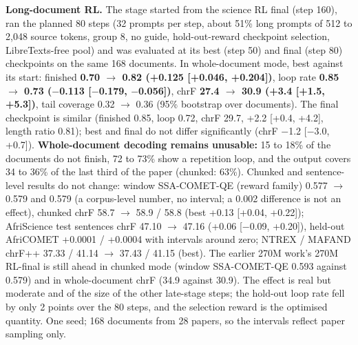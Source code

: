 \textbf{Long-document RL.} The stage started from the science RL final (step 160), ran the planned 80 steps (32 prompts per step, about 51\% long prompts of 512 to 2,048 source tokens, group 8, no guide, hold-out-reward checkpoint selection, LibreTexts-free pool) and was evaluated at its best (step 50) and final (step 80) checkpoints on the same 168 documents. In whole-document mode, best against its start: finished \textbf{0.70 $\to$ 0.82 (+0.125 [+0.046, +0.204])}, loop rate \textbf{0.85 $\to$ 0.73 (\ensuremath{-}0.113 [\ensuremath{-}0.179, \ensuremath{-}0.056])}, chrF \textbf{27.4 $\to$ 30.9 (+3.4 [+1.5, +5.3])}, tail coverage 0.32 $\to$ 0.36 (95\% bootstrap over documents). The final checkpoint is similar (finished 0.85, loop 0.72, chrF 29.7, +2.2 [+0.4, +4.2], length ratio 0.81); best and final do not differ significantly (chrF \ensuremath{-}1.2 [\ensuremath{-}3.0, +0.7]). \textbf{Whole-document decoding remains unusable:} 15 to 18\% of the documents do not finish, 72 to 73\% show a repetition loop, and the output covers 34 to 36\% of the last third of the paper (chunked: 63\%). Chunked and sentence-level results do not change: window SSA-COMET-QE (reward family) 0.577 $\to$ 0.579 and 0.579 (a corpus-level number, no interval; a 0.002 difference is not an effect), chunked chrF 58.7 $\to$ 58.9 / 58.8 (best +0.13 [+0.04, +0.22]); AfriScience test sentences chrF 47.10 $\to$ 47.16 (+0.06 [\ensuremath{-}0.09, +0.20]), held-out AfriCOMET +0.0001 / +0.0004 with intervals around zero; NTREX / MAFAND chrF++ 37.33 / 41.14 $\to$ 37.43 / 41.15 (best). The earlier 270M work's 270M RL-final is still ahead in chunked mode (window SSA-COMET-QE 0.593 against 0.579) and in whole-document chrF (34.9 against 30.9). The effect is real but moderate and of the size of the other late-stage steps; the hold-out loop rate fell by only 2 points over the 80 steps, and the selection reward is the optimised quantity. One seed; 168 documents from 28 papers, so the intervals reflect paper sampling only. 

